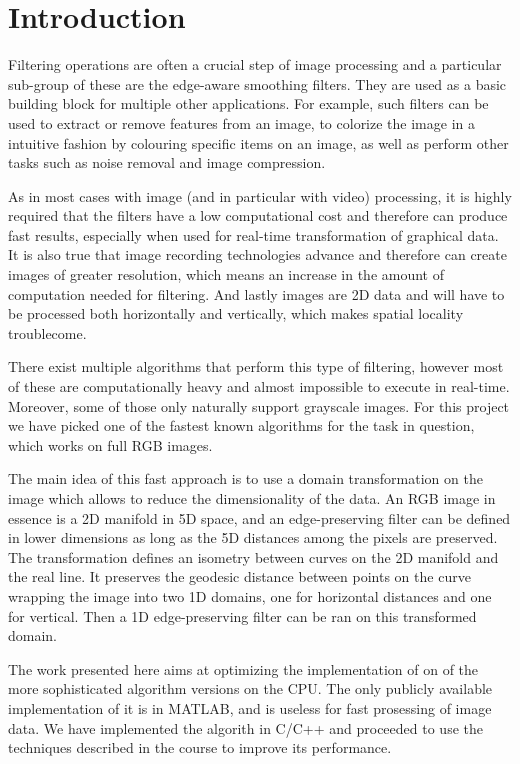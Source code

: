 \section{Introduction}\label{sec:intro}

Filtering operations are often a crucial step of image processing and a particular sub-group of these are the edge-aware smoothing filters. 
They are used as a basic building block for multiple other applications.
For example, such filters can be used to extract or remove features from an
image, to colorize the image in a intuitive fashion by colouring specific
items on an image, as well as perform other tasks such as noise removal and
image compression.

As in most cases with image (and in particular with video) processing, it is
highly required that the filters have a low computational cost and therefore
can produce fast results, especially when used for real-time transformation of
graphical data. It is also true that image recording technologies advance and 
therefore can create images of greater resolution, which means an increase in
the amount of computation needed for filtering. And lastly images are 2D data
and will have to be processed both horizontally and vertically, which makes
spatial locality troublecome.

There exist multiple algorithms that perform this type of filtering, however
most of these are computationally heavy and almost impossible to execute in
real-time. Moreover, some of those only naturally support grayscale images. 
For this project we have picked one of the fastest known algorithms for the
task in question, which works on full RGB images.

The main idea of this fast approach is to use a domain transformation on the
image which allows to reduce the dimensionality of the data. An RGB image in
essence is a 2D manifold in 5D space, and an edge-preserving filter can be
defined in lower dimensions as long as the 5D distances among the pixels are
preserved. The transformation defines an isometry between curves on the 2D
manifold and the real line. It preserves the geodesic distance between points
on the curve wrapping the image into two 1D domains, one for horizontal 
distances and one for vertical. Then a 1D edge-preserving filter can be ran on
this transformed domain.

The work presented here aims at optimizing the implementation of on of the 
more sophisticated algorithm versions on the CPU. The only publicly available
implementation of it is in MATLAB, and is useless for fast prosessing of image
data. We have implemented the algorith in C/C++ and proceeded to use the
techniques described in the course to improve its performance.

